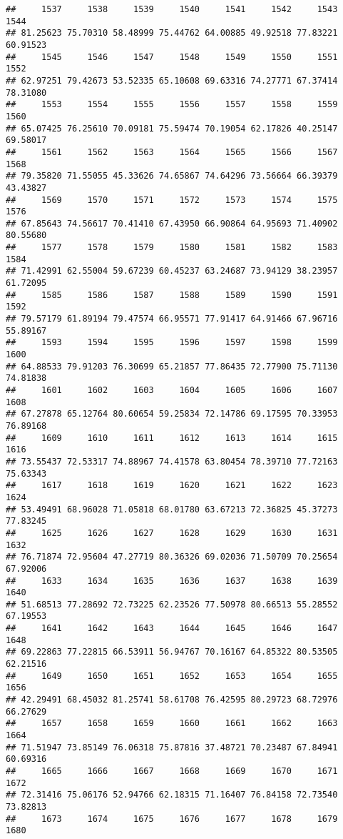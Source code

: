 \documentclass[
]{article}
\begin{document}
\begin{verbatim}
##     1537     1538     1539     1540     1541     1542     1543     1544 
## 81.25623 75.70310 58.48999 75.44762 64.00885 49.92518 77.83221 60.91523 
##     1545     1546     1547     1548     1549     1550     1551     1552 
## 62.97251 79.42673 53.52335 65.10608 69.63316 74.27771 67.37414 78.31080 
##     1553     1554     1555     1556     1557     1558     1559     1560 
## 65.07425 76.25610 70.09181 75.59474 70.19054 62.17826 40.25147 69.58017 
##     1561     1562     1563     1564     1565     1566     1567     1568 
## 79.35820 71.55055 45.33626 74.65867 74.64296 73.56664 66.39379 43.43827 
##     1569     1570     1571     1572     1573     1574     1575     1576 
## 67.85643 74.56617 70.41410 67.43950 66.90864 64.95693 71.40902 80.55680 
##     1577     1578     1579     1580     1581     1582     1583     1584 
## 71.42991 62.55004 59.67239 60.45237 63.24687 73.94129 38.23957 61.72095 
##     1585     1586     1587     1588     1589     1590     1591     1592 
## 79.57179 61.89194 79.47574 66.95571 77.91417 64.91466 67.96716 55.89167 
##     1593     1594     1595     1596     1597     1598     1599     1600 
## 64.88533 79.91203 76.30699 65.21857 77.86435 72.77900 75.71130 74.81838 
##     1601     1602     1603     1604     1605     1606     1607     1608 
## 67.27878 65.12764 80.60654 59.25834 72.14786 69.17595 70.33953 76.89168 
##     1609     1610     1611     1612     1613     1614     1615     1616 
## 73.55437 72.53317 74.88967 74.41578 63.80454 78.39710 77.72163 75.63343 
##     1617     1618     1619     1620     1621     1622     1623     1624 
## 53.49491 68.96028 71.05818 68.01780 63.67213 72.36825 45.37273 77.83245 
##     1625     1626     1627     1628     1629     1630     1631     1632 
## 76.71874 72.95604 47.27719 80.36326 69.02036 71.50709 70.25654 67.92006 
##     1633     1634     1635     1636     1637     1638     1639     1640 
## 51.68513 77.28692 72.73225 62.23526 77.50978 80.66513 55.28552 67.19553 
##     1641     1642     1643     1644     1645     1646     1647     1648 
## 69.22863 77.22815 66.53911 56.94767 70.16167 64.85322 80.53505 62.21516 
##     1649     1650     1651     1652     1653     1654     1655     1656 
## 42.29491 68.45032 81.25741 58.61708 76.42595 80.29723 68.72976 66.27629 
##     1657     1658     1659     1660     1661     1662     1663     1664 
## 71.51947 73.85149 76.06318 75.87816 37.48721 70.23487 67.84941 60.69316 
##     1665     1666     1667     1668     1669     1670     1671     1672 
## 72.31416 75.06176 52.94766 62.18315 71.16407 76.84158 72.73540 73.82813 
##     1673     1674     1675     1676     1677     1678     1679     1680 

\end{verbatim}
\end{document}
